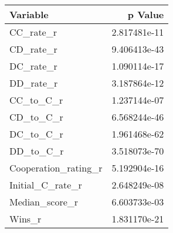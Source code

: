 \begin{tabular}{lr}
\toprule
             Variable &       p Value \\
\midrule
            CC\_rate\_r &  2.817481e-11 \\
            CD\_rate\_r &  9.406413e-43 \\
            DC\_rate\_r &  1.090114e-17 \\
            DD\_rate\_r &  3.187864e-12 \\
            CC\_to\_C\_r &  1.237144e-07 \\
            CD\_to\_C\_r &  6.568244e-46 \\
            DC\_to\_C\_r &  1.961468e-62 \\
            DD\_to\_C\_r &  3.518073e-70 \\
 Cooperation\_rating\_r &  5.192904e-16 \\
     Initial\_C\_rate\_r &  2.648249e-08 \\
       Median\_score\_r &  6.603733e-03 \\
               Wins\_r &  1.831170e-21 \\
\bottomrule
\end{tabular}
